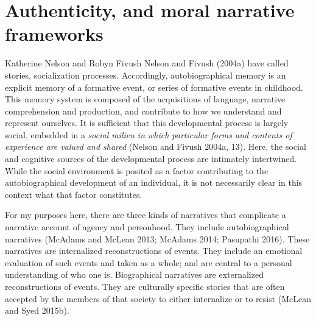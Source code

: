\documentclass[12pt]{book}
\theoremstyle{definition}
\theoremstyle{remark}
\begin{document}
\section{Authenticity, and moral narrative frameworks}\label{authenticity-and-moral-narrative-frameworks}

Katherine Nelson and Robyn Fivush Nelson and Fivush (2004a) have called stories, socialization processes. Accordingly, autobiographical memory is an explicit memory of a formative event, or series of formative events in childhood. This memory system is composed of the acquisitions of language, narrative comprehension and production, and contribute to how we understand and represent ourselves. It is sufficient that this developmental process is largely social, embedded in a \emph{social milieu in which particular forms and contents of experience are valued and shared} (Nelson and Fivush 2004a, 13). Here, the social and cognitive sources of the developmental process are intimately intertwined. While the social environment is posited as a factor contributing to the autobiographical development of an individual, it is not necessarily clear in this context what that factor constitutes.

For my purposes here, there are three kinds of narratives that complicate a narrative account of agency and personhood. They include autobiographical narratives (McAdams and McLean 2013; McAdams 2014; Pasupathi 2016). These narratives are internalized reconstructions of events. They include an emotional evaluation of such events and taken as a whole; and are central to a personal understanding of who one is. Biographical narratives are externalized reconstructions of events. They are culturally specific stories that are often accepted by the members of that society to either internalize or to resist (McLean and Syed 2015b).
\end{document}
